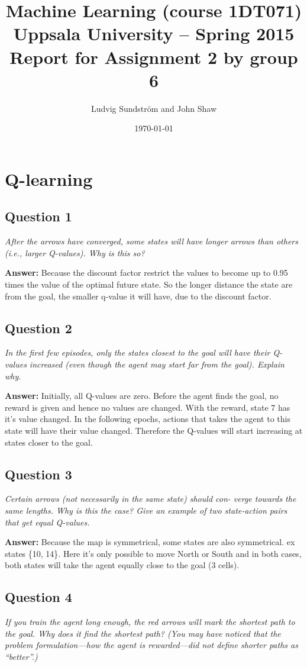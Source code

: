 \documentclass[a4paper]{article}
\title{Machine Learning (course 1DT071)
Uppsala University – Spring 2015
Report for Assignment 2 by group 6}
\author{Ludvig Sundstr\"{o}m and John Shaw}
\date{\today}
\begin{document}
\maketitle

\section{Q-learning}

\subsection*{Question 1}
\emph{After the arrows have converged, some states will have longer
arrows than others (i.e., larger Q-values). Why is this so?}

\textbf{Answer:} Because the discount factor restrict the values to become up to 0.95 times the value of the optimal future state. So the longer distance the state are from the goal, the smaller q-value it will have, due to the discount factor. 

\subsection*{Question 2}
\emph{In the first few episodes, only the states closest to the goal will
have their Q-values increased (even though the agent may start far from the
goal). Explain why.}

\textbf{Answer:} Initially, all Q-values are zero. Before the agent finds the goal, no reward is given and hence no values are changed. With the reward, state 7 has it's value changed. In the following epochs, actions that takes the agent to this state will have their value changed. Therefore the Q-values will start increasing at states closer to the goal.

\subsection*{Question 3}
\emph{Certain arrows (not necessarily in the same state) should con-
verge towards the same lengths. Why is this the case? Give an example of two
state-action pairs that get equal Q-values.}

\textbf{Answer:} Because the map is symmetrical, some states are also symmetrical. ex states \{10, 14\}. Here it's only possible to move North or South and in both cases, both states will take the agent equally close to the goal (3 cells). 

\subsection*{Question 4}
\emph{If you train the agent long enough, the red arrows will mark the
shortest path to the goal. Why does it find the shortest path? (You may have noticed that the problem formulation—how the agent is rewarded—did not define shorter paths as ``better''.)}
\end{document}

